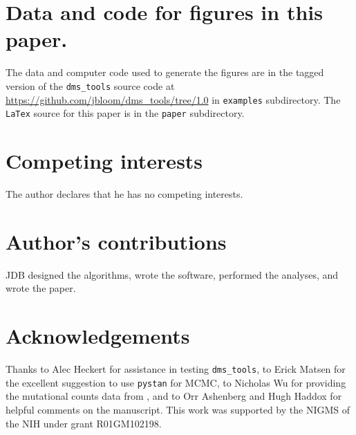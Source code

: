 \documentclass[twocolumn]{bmcart}%
\begin{document}
\section*{Data and code for figures in this paper.}
The data and computer code used to generate the figures are in the tagged version of the \texttt{dms\_tools} source code at \url{https://github.com/jbloom/dms_tools/tree/1.0} in \texttt{examples} subdirectory. The \texttt{LaTex} source for this paper is in the \texttt{paper} subdirectory.


\begin{backmatter}

\section*{Competing interests}
  The author declares that he has no competing interests.

\section*{Author's contributions}
JDB designed the algorithms, wrote the software, performed the analyses, and wrote the paper.

\section*{Acknowledgements}
Thanks to Alec Heckert for assistance in testing \texttt{dms\_tools}, to Erick Matsen for the excellent suggestion to use \texttt{pystan} for MCMC,  to Nicholas Wu for providing the mutational counts data from \cite{wu2014ns}, and to Orr Ashenberg and Hugh Haddox for helpful comments on the manuscript. This work was supported by the NIGMS of the NIH under grant R01GM102198.


\end{backmatter}
\end{document}
